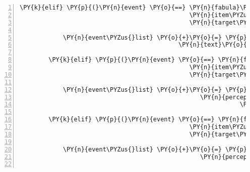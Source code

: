 \begin{Verbatim}[commandchars=\\\{\},numbers=left,firstnumber=1,stepnumber=1]
        \PY{k}{elif} \PY{p}{(}\PY{n}{event} \PY{o}{==} \PY{n}{fabula}\PY{o}{.}\PY{n}{TriesToDropEvent}\PY{p}{(}\PY{n}{identifier}\PY{o}{=}\PY{n}{ID\PYZus{}KUNI}\PY{p}{,}
                                               \PY{n}{item\PYZus{}identifier}\PY{o}{=}\PY{l+s}{\PYZsq{}}\PY{l+s}{cobweb}\PY{l+s}{\PYZsq{}}\PY{p}{,}
                                               \PY{n}{target\PYZus{}identifier}\PY{o}{=}\PY{n}{ID\PYZus{}KUNI}\PY{p}{)}\PY{p}{)}\PY{p}{:}

            \PY{n}{event\PYZus{}list} \PY{o}{+}\PY{o}{=} \PY{p}{[}\PY{n}{fabula}\PY{o}{.}\PY{n}{SaysEvent}\PY{p}{(}\PY{n}{identifier}\PY{o}{=}\PY{n}{ID\PYZus{}KUNI}\PY{p}{,}
                                            \PY{n}{text}\PY{o}{=}\PY{l+s}{\PYZsq{}}\PY{l+s}{Ihh, sind die klebrig \PYZhy{} damit könnte man bestimmt gut Dinge kleben.}\PY{l+s}{\PYZsq{}}\PY{p}{)}\PY{p}{]}

        \PY{k}{elif} \PY{p}{(}\PY{n}{event} \PY{o}{==} \PY{n}{fabula}\PY{o}{.}\PY{n}{TriesToDropEvent}\PY{p}{(}\PY{n}{identifier}\PY{o}{=}\PY{n}{ID\PYZus{}KUNI}\PY{p}{,}
                                               \PY{n}{item\PYZus{}identifier}\PY{o}{=}\PY{l+s}{\PYZsq{}}\PY{l+s}{cobweb}\PY{l+s}{\PYZsq{}}\PY{p}{,}
                                               \PY{n}{target\PYZus{}identifier}\PY{o}{=}\PY{l+s}{\PYZsq{}}\PY{l+s}{spider}\PY{l+s}{\PYZsq{}}\PY{p}{)}\PY{p}{)}\PY{p}{:}

            \PY{n}{event\PYZus{}list} \PY{o}{+}\PY{o}{=} \PY{p}{[}\PY{n}{fabula}\PY{o}{.}\PY{n}{PerceptionEvent}\PY{p}{(}\PY{n}{identifier}\PY{o}{=}\PY{n}{ID\PYZus{}KUNI}\PY{p}{,}
                                                  \PY{n}{perception}\PY{o}{=}\PY{l+s}{\PYZsq{}}\PY{l+s}{Ganz schön klebrig, }\PY{l+s}{\PYZsq{}}
                                                             \PY{l+s}{\PYZsq{}}\PY{l+s}{vielleicht kann ich es besser woanders benutzen.}\PY{l+s}{\PYZsq{}}\PY{p}{)}\PY{p}{]}

        \PY{k}{elif} \PY{p}{(}\PY{n}{event} \PY{o}{==} \PY{n}{fabula}\PY{o}{.}\PY{n}{TriesToDropEvent}\PY{p}{(}\PY{n}{identifier}\PY{o}{=}\PY{n}{ID\PYZus{}KUNI}\PY{p}{,}
                                               \PY{n}{item\PYZus{}identifier}\PY{o}{=}\PY{l+s}{\PYZsq{}}\PY{l+s}{cobweb}\PY{l+s}{\PYZsq{}}\PY{p}{,}
                                               \PY{n}{target\PYZus{}identifier}\PY{o}{=}\PY{l+s}{\PYZsq{}}\PY{l+s}{sign}\PY{l+s}{\PYZsq{}}\PY{p}{)}\PY{p}{)}\PY{p}{:}

            \PY{n}{event\PYZus{}list} \PY{o}{+}\PY{o}{=} \PY{p}{[}\PY{n}{fabula}\PY{o}{.}\PY{n}{PerceptionEvent}\PY{p}{(}\PY{n}{identifier}\PY{o}{=}\PY{n}{ID\PYZus{}KUNI}\PY{p}{,}
                                                  \PY{n}{perception}\PY{o}{=}\PY{l+s}{\PYZsq{}}\PY{l+s}{Ich möchte den Spinnweb nicht an das Schild kleben.}\PY{l+s}{\PYZsq{}}\PY{p}{)}\PY{p}{]}


\end{Verbatim}
